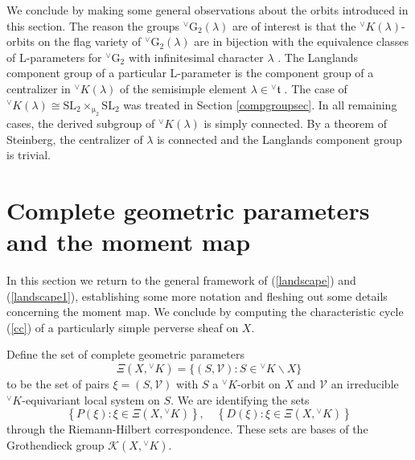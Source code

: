 \documentclass[a4paper, 11pt]{article}
\begin{document}
We conclude by making some general observations about the orbits
introduced in this section. The reason the groups
${^\vee}\mathrm{G}_{2}(\lambda)$ are of interest 
is that the 
${^\vee}K(\lambda)$-orbits on the flag variety of ${^\vee}\mathrm{G}_{2}(\lambda)$
are in bijection with the equivalence classes of L-parameters for
${^\vee}\mathrm{G}_{2}$ with infinitesimal character $\lambda$
\cite[Proposition 6.16   and Proposition 6.17]{ABV}.   The Langlands
component group of a particular L-parameter is the component group of
a centralizer in ${^\vee}K(\lambda)$ of the semisimple element
$\lambda \in {^\vee}\mathfrak{t}$ \cite[Corollary 5.9 (c)]{ABV}.  The case of
${^\vee}K(\lambda) \cong \mathrm{SL}_{2} \times_{\upmu_{2}}
\mathrm{SL}_{2}$ was treated in Section \ref{compgroupsec}.  In all
remaining cases, the derived subgroup of ${^\vee}K(\lambda)$ is simply
connected.  By a theorem of Steinberg, the centralizer of $\lambda$ is
connected and the Langlands component group is trivial.  


\section{Complete geometric parameters and the moment map}
\label{sec:momap}

In this section we return to the general framework of (\ref{landscape})
and (\ref{landscape1}), establishing some more notation and fleshing
out some details concerning the moment map.  We conclude by computing
the characteristic cycle (\ref{cc}) of a particularly simple perverse
sheaf on $X$.

 
Define the set of complete geometric parameters 
\begin{equation}
\label{geoparam}
\Xi\left(X, {^\vee}K\right) = \{ (S, \mathcal{V}) : S \in {^\vee}K
\backslash X \}
\end{equation}
 to be the set of pairs $\xi = (S,\mathcal{V})$
with $S$ a ${^\vee}K$-orbit on $X$ and $\mathcal{V}$ an irreducible
${^\vee}K$-equivariant 
local system on $S$. We are identifying the sets
$$\left\{P(\xi):\xi\in \Xi\left(X, {^\vee}K\right)\right\},\quad
\left\{D(\xi):\xi\in \Xi\left(X, {^\vee}K\right)\right\}$$
through the Riemann-Hilbert correspondence.  These sets  
are bases of the Grothendieck group $\mathscr{K}(X,{^\vee}K)$.  
\end{document}
